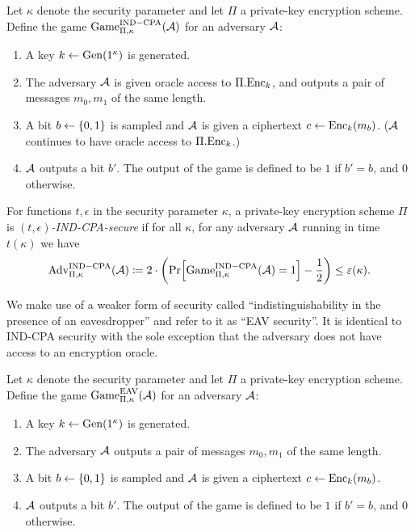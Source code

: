 \begin{definition}
	Let $\kappa$ denote the security parameter and let $\Pi$ a private-key encryption scheme. Define the game $\mathrm{Game}_{\Pi, \kappa}^{\mathrm{IND-CPA}}(\mathcal{A})$ for an adversary $\mathcal{A}$:
	\begin{enumerate}[1.]
		\item A key $k \leftarrow \mathrm{Gen}(1^\kappa)$ is generated.
		\item The adversary $\mathcal{A}$ is given oracle access to $\Pi.\mathrm{Enc}_k$, and outputs a pair of messages $m_0, m_1$ of the same length.
		\item A bit $b \leftarrow \{0, 1\}$ is sampled and $\mathcal{A}$ is given a ciphertext $c \leftarrow \mathrm{Enc}_k(m_b)$. ($\mathcal{A}$ continues to have oracle access to $\Pi.\mathrm{Enc}_k$.)
		\item $\mathcal{A}$ outputs a bit $b'$. The output of the game is defined to be $1$ if $b' = b$, and $0$ otherwise.
	\end{enumerate}
\end{definition}

\begin{definition}
	For functions $t, \epsilon$ in the security parameter $\kappa$, a private-key encryption scheme $\Pi$ is \emph{$(t, \epsilon)$-IND-CPA-secure} if for all $\kappa$, for any adversary $\mathcal{A}$ running in time $t(\kappa)$ we have
	\begin{align*}
		\advantage{\Pi}{\kappa}{IND-CPA}(\adv) \coloneqq 2 \cdot \left(\pr{\game{\Pi}{\kappa}{IND-CPA}(\adv) = 1} - \frac{1}{2}\right) \le \epsilon(\kappa).
	\end{align*}
\end{definition}

We make use of a weaker form of security called ``indistinguishability in the presence of an eavesdropper'' \cite{introduction-to-modern-cryptography} and refer to it as ``EAV security''. It is identical to IND-CPA security with the sole exception that the adversary does not have access to an encryption oracle.

\begin{definition}
	Let $\kappa$ denote the security parameter and let $\Pi$ a private-key encryption scheme. Define the game $\mathrm{Game}_{\Pi, \kappa}^{\mathrm{EAV}}(\mathcal{A})$ for an adversary $\mathcal{A}$:
	\begin{enumerate}[1.]
		\item A key $k \leftarrow \mathrm{Gen}(1^\kappa)$ is generated.
		\item The adversary $\mathcal{A}$ outputs a pair of messages $m_0, m_1$ of the same length.
		\item A bit $b \leftarrow \{0, 1\}$ is sampled and $\mathcal{A}$ is given a ciphertext $c \leftarrow \mathrm{Enc}_k(m_b)$.
		\item $\mathcal{A}$ outputs a bit $b'$. The output of the game is defined to be $1$ if $b' = b$, and $0$ otherwise.
	\end{enumerate}
\end{definition}

